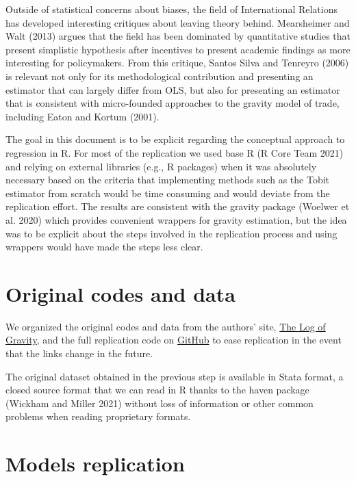 \documentclass[letterpaper,twoside,12pt]{article}
\begin{document}
Outside of statistical concerns about biases, the field of International
Relations has developed interesting critiques about leaving theory
behind. Mearsheimer and Walt (2013) argues that the field has been
dominated by quantitative studies that present simplistic hypothesis
after incentives to present academic findings as more interesting for
policymakers. From this critique, Santos Silva and Tenreyro (2006) is
relevant not only for its methodological contribution and presenting an
estimator that can largely differ from OLS, but also for presenting an
estimator that is consistent with micro-founded approaches to the
gravity model of trade, including Eaton and Kortum (2001).

The goal in this document is to be explicit regarding the conceptual
approach to regression in R. For most of the replication we used base R
(R Core Team 2021) and relying on external libraries (e.g., R packages)
when it was absolutely necessary based on the criteria that implementing
methods such as the Tobit estimator from scratch would be time consuming
and would deviate from the replication effort. The results are
consistent with the gravity package (Woelwer et al. 2020) which provides
convenient wrappers for gravity estimation, but the idea was to be
explicit about the steps involved in the replication process and using
wrappers would have made the steps less clear.

\section{Original codes and data}\label{original-codes-and-data}

We organized the original codes and data from the authors' site,
\href{https://personal.lse.ac.uk/tenreyro/lgw.html}{The Log of Gravity},
and the full replication code on
\href{https://github.com/pachadotdev/log-of-gravity}{GitHub} to ease
replication in the event that the links change in the future.

The original dataset obtained in the previous step is available in Stata
format, a closed source format that we can read in R thanks to the haven
package (Wickham and Miller 2021) without loss of information or other
common problems when reading proprietary formats.

\section{Models replication}\label{models-replication}
\end{document}

